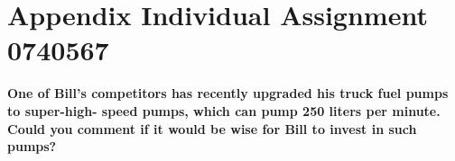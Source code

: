 \section{Appendix Individual Assignment 0740567}\label{app:indivnicky}
\textbf{One of Bill’s competitors has recently upgraded his truck fuel pumps to super-high- speed pumps, which can pump 250 liters per minute. Could you comment if it would be wise for Bill to invest in such pumps?}\\
\\